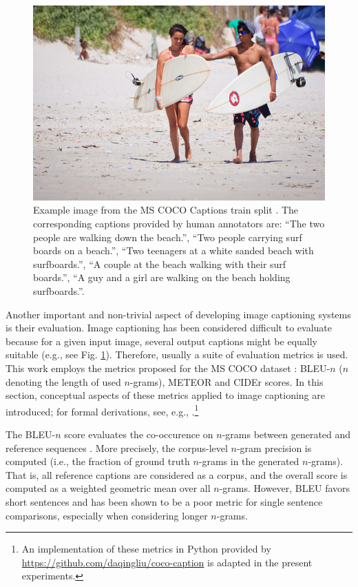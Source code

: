 \begin{figure}
	\centering
	\includegraphics[width=0.7\linewidth]{images/COCO_train2014_example.jpg}
	\caption{Example image from the MS COCO Captions train split \parencite{chen2015microsoft}. The corresponding captions provided by human annotators are: ``The two people are walking down the beach.'', ``Two people carrying surf boards on a beach.'', ``Two teenagers at a white sanded beach with surfboards.'', ``A couple at the beach walking with their surf boards.'', ``A guy and a girl are walking on the beach holding surfboards.''. }
	\label{fig:coco_example}
\end{figure}

Another important and non-trivial aspect of developing image captioning systems is their evaluation. Image captioning has been considered difficult to evaluate because for a given input image, several output captions might be equally suitable (e.g., see Fig. \ref{fig:coco_example}). Therefore, usually a suite of evaluation metrics is used. This work employs the metrics proposed for the MS COCO dataset \parencite{chen2015microsoft}: BLEU-$n$ ($n$ denoting the length of used $n$-grams), METEOR and CIDEr scores. In this section, conceptual aspects of these metrics applied to image captioning are introduced; for formal derivations, see, e.g., \cite{chen2015microsoft}.\footnote{An implementation of these metrics in Python provided by \url{https://github.com/daqingliu/coco-caption} is adapted in the present experiments.}

The BLEU-$n$ score evaluates the co-occurence on $n$-grams between generated and reference sequences \parencite{papineni2002bleu}. More precisely, the corpus-level $n$-gram precision is computed (i.e., the fraction of ground truth $n$-grams in the generated $n$-grams). That is, all reference captions are considered as a corpus, and the overall score is computed as a weighted geometric mean over all $n$-grams. However, BLEU favors short sentences and has been shown to be a poor metric for single sentence comparisons, especially when considering longer $n$-grams.

